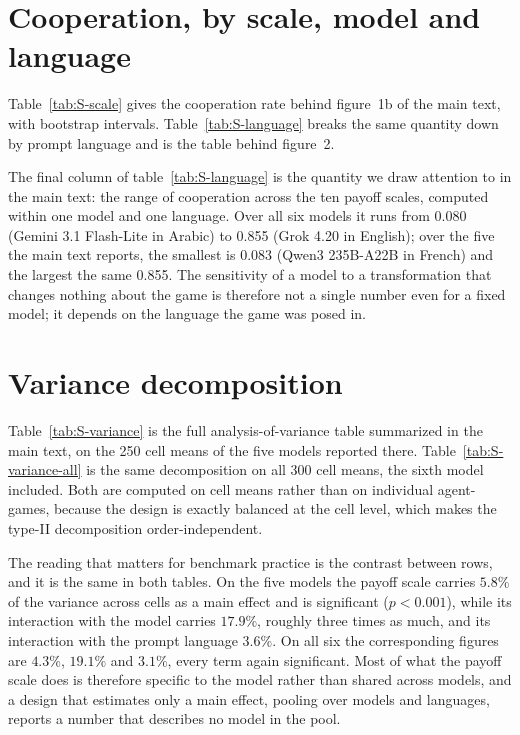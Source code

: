 \documentclass[11pt,a4paper]{article}
\begin{document}
\section{Cooperation, by scale, model and language}

Table~\ref{tab:S-scale} gives the cooperation rate behind
figure~1b of the main text, with bootstrap intervals.
Table~\ref{tab:S-language} breaks the same quantity down by prompt language and
is the table behind figure~2.

The final column of table~\ref{tab:S-language} is the quantity we draw
attention to in the main text: the range of cooperation across the ten payoff
scales, computed within one model and one language. Over all six models it runs
from 0.080 (Gemini 3.1 Flash-Lite in Arabic) to 0.855 (Grok 4.20 in English);
over the five the main text reports, the smallest is 0.083 (Qwen3 235B-A22B in
French) and the largest the same 0.855. The
sensitivity of a model to a transformation that changes nothing about the game
is therefore not a single number even for a fixed model; it depends on the
language the game was posed in.

\section{Variance decomposition}

Table~\ref{tab:S-variance} is the full analysis-of-variance table summarized in
the main text, on the 250 cell means of the five models reported there.
Table~\ref{tab:S-variance-all} is the same decomposition on all 300 cell means,
the sixth model included. Both are computed on cell means rather than on
individual agent-games, because the design is exactly balanced at the cell
level, which makes the type-II decomposition order-independent.

The reading that matters for benchmark practice is the contrast between rows,
and it is the same in both tables. On the five models the payoff scale carries
$5.8\%$ of the variance across cells as a main effect and is significant
($p < 0.001$), while its interaction with the model carries $17.9\%$, roughly
three times as much, and its interaction with the prompt language $3.6\%$. On
all six the corresponding figures are $4.3\%$, $19.1\%$ and $3.1\%$, every term
again significant. Most of what the payoff scale does is therefore specific to
the model rather than shared across models, and a design that estimates only a
main effect, pooling over models and languages, reports a number that describes
no model in the pool.
\end{document}
